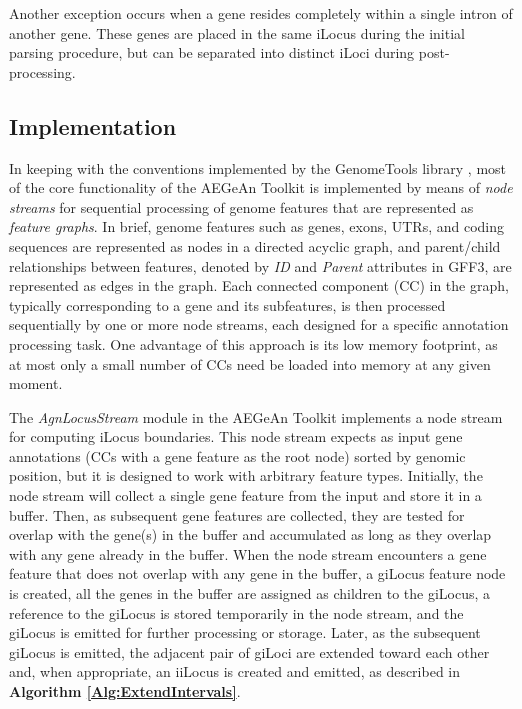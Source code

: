 Another exception occurs when a gene resides completely within a single intron of another gene.
These genes are placed in the same iLocus during the initial parsing procedure, but can be separated into distinct iLoci during post-processing.


\subsection{Implementation}
In keeping with the conventions implemented by the GenomeTools library \cite{GenomeTools}, most of the core functionality of the AEGeAn Toolkit \cite{AEGeAn} is implemented by means of \textit{node streams} for sequential processing of genome features that are represented as \textit{feature graphs}.
In brief, genome features such as genes, exons, UTRs, and coding sequences are represented as nodes in a directed acyclic graph, and parent/child relationships between features, denoted by \textit{ID} and \textit{Parent} attributes in GFF3, are represented as edges in the graph.
Each connected component (CC) in the graph, typically corresponding to a gene and its subfeatures, is then processed sequentially by one or more node streams, each designed for a specific annotation processing task.
One advantage of this approach is its low memory footprint, as at most only a small number of CCs need be loaded into memory at any given moment.

The \textit{AgnLocusStream} module in the AEGeAn Toolkit implements a node stream for computing iLocus boundaries.
This node stream expects as input gene annotations (CCs with a gene feature as the root node) sorted by genomic position, but it is designed to work with arbitrary feature types.
Initially, the node stream will collect a single gene feature from the input and store it in a buffer.
Then, as subsequent gene features are collected, they are tested for overlap with the gene(s) in the buffer and accumulated as long as they overlap with any gene already in the buffer.
When the node stream encounters a gene feature that does not overlap with any gene in the buffer, a giLocus feature node is created, all the genes in the buffer are assigned as children to the giLocus, a reference to the giLocus is stored temporarily in the node stream, and the giLocus is emitted for further processing or storage.
Later, as the subsequent giLocus is emitted, the adjacent pair of giLoci are extended toward each other and, when appropriate, an iiLocus is created and emitted, as described in \textbf{Algorithm \ref{Alg:ExtendIntervals}}.

